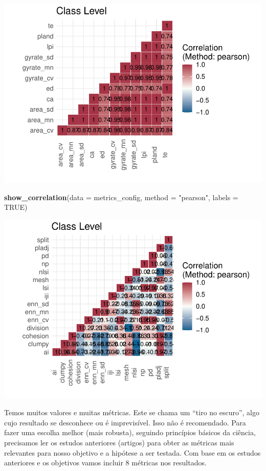 \documentclass[
]{article}
\newenvironment{Shaded}{\begin{snugshade}}{\end{snugshade}}
\newcommand{\AttributeTok}[1]{\textcolor[rgb]{0.13,0.29,0.53}{#1}}
\newcommand{\ConstantTok}[1]{\textcolor[rgb]{0.56,0.35,0.01}{#1}}
\newcommand{\FunctionTok}[1]{\textcolor[rgb]{0.13,0.29,0.53}{\textbf{#1}}}
\newcommand{\NormalTok}[1]{#1}
\newcommand{\StringTok}[1]{\textcolor[rgb]{0.31,0.60,0.02}{#1}}
\begin{document}
\includegraphics{epr_files/figure-latex/unnamed-chunk-59-1.pdf}

\begin{Shaded}
\begin{Highlighting}[]
\FunctionTok{show\_correlation}\NormalTok{(}\AttributeTok{data =}\NormalTok{ metrics\_config, }\AttributeTok{method =} \StringTok{"pearson"}\NormalTok{, }\AttributeTok{labels =} \ConstantTok{TRUE}\NormalTok{)}
\end{Highlighting}
\end{Shaded}

\includegraphics{epr_files/figure-latex/unnamed-chunk-59-2.pdf}

Temos muitos valores e muitas métricas.
Este se chama um ``tiro no escuro'', algo cujo resultado se desconhece
ou é imprevisível. Isso não é recomendado.
Para fazer uma escolha melhor (mais robusta), seguindo princípios
básicos da ciência, precisamos ler os estudos anteriores
(artigos) para obter as métricas mais relevantes para nosso objetivo e
a hipótese a ser testada. Com base em os estudos anteriores e os
objetivos vamos incluir 8 métricas nos resultados.
\end{document}

